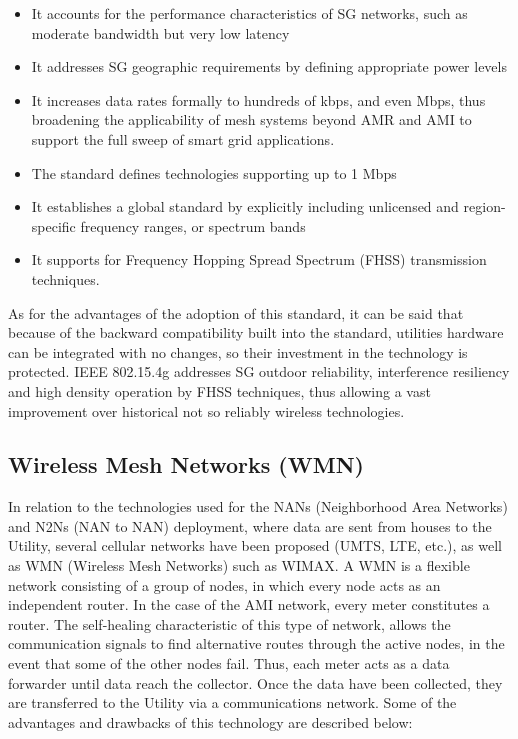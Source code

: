 \documentclass[11pt,final,onecolumn]{IEEEtran}
\begin{document}
\begin{itemize}
	\item It accounts for the performance characteristics of SG networks, such as moderate bandwidth but very low latency
	\item It addresses SG geographic requirements by defining appropriate power levels
	\item It increases data rates formally to hundreds of kbps, and even Mbps, thus broadening the applicability of mesh systems beyond AMR and AMI to support the full sweep of smart grid applications. 
	\item The standard defines technologies supporting up to 1 Mbps
	\item It establishes a global standard by explicitly including unlicensed and region-specific frequency ranges, or spectrum bands
	\item It supports for Frequency Hopping Spread Spectrum (FHSS) transmission techniques.

\end{itemize}

As for the advantages of the adoption of this standard, it can be said that because of the backward compatibility built into the standard, utilities hardware can be integrated with no changes, so their investment in the technology is protected. IEEE 802.15.4g addresses SG outdoor reliability, interference resiliency and high density operation by FHSS techniques, thus allowing a vast improvement over historical not so reliably wireless technologies.

\subsection{Wireless Mesh Networks (WMN)}\label{wmn}
In relation to the technologies used for the NANs (Neighborhood Area Networks) and N2Ns (NAN to NAN) deployment, where data are sent from houses to the Utility, several cellular networks have been proposed (UMTS, LTE, etc.), as well as WMN (Wireless Mesh Networks) such as WIMAX. A WMN is a flexible network consisting of a group of nodes, in which every node acts as an independent router. In the case of the AMI network, every meter constitutes a router. The self-healing characteristic of this type of network, allows the communication signals to find alternative routes through the active nodes, in the event that some of the other nodes fail. Thus, each meter acts as a data forwarder until data reach the collector. Once the data have been collected, they are transferred to the Utility via a communications network. Some of the advantages and drawbacks of this technology are described below:
\end{document}
